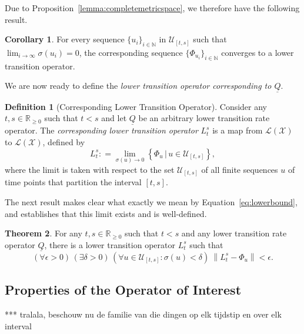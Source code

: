 \documentclass[10pt]{paper}
\theoremstyle{definition}
\newtheorem{theorem}{Theorem}
\newtheorem{corollary}[theorem]{Corollary}
\newtheorem{definition}{Definition}
\newcommand{\nats}{\mathbb{N}}
\newcommand{\reals}{\mathbb{R}}
\newcommand{\realsnonneg}{\reals_{\geq 0}}
\newcommand{\states}{\mathcal{X}}
\newcommand{\lbound}{L}
\newcommand{\gambles}{\mathcal{L}}
\newcommand{\gamblesX}{\gambles(\states)}
\newcommand{\lrate}{\underline{Q}}
\newcommand{\norm}[1]{\left\lVert #1 \right\rVert}
\newcommand{\coloneqq}{:\!=}
\begin{document}
\noindent Due to Proposition~\ref{lemma:completemetricspace}, we therefore have the following result.

\begin{corollary}\label{corol:limitexistsandiscoherent}
For every sequence $\{u_i\}_{i\in\nats}$ in $\mathcal{U}_{[t,s]}$ such that $\lim_{i\to\infty}\sigma(u_i)=0$, the corresponding sequence $\{\Phi_{u_i}\}_{i\in\nats}$ converges to a lower transition operator.
\end{corollary}

\noindent We are now ready to define the \emph{lower transition operator corresponding to $\lrate$}.

\begin{definition}[Corresponding Lower Transition Operator]\label{def:low_trans}
Consider any $t,s\in\realsnonneg$ such that $t<s$ and let $\lrate$ be an arbitrary lower transition rate operator. The \emph{corresponding lower transition operator} $\lbound_t^s$ is a map from $\gamblesX$ to $\gamblesX$, defined by
\begin{equation}\label{eq:lowerbound}
\lbound_t^s\coloneqq\lim_{\sigma(u)\to0}\left\{ \Phi_u\,\Big\vert\,u\in\mathcal{U}_{[t,s]}\right\},
\end{equation}
where the limit is taken with respect to the set $\mathcal{U}_{[t,s]}$ of all finite sequences $u$ of time points that partition the interval $[t,s]$.
\end{definition}

\noindent The next result makes clear what exactly we mean by Equation~\eqref{eq:lowerbound}, and establishes that this limit exists and is well-defined.

\begin{theorem}\label{theo:convergencelowerbound}
For any $t,s\in\realsnonneg$ such that $t<s$ and any lower transition rate operator $\lrate$, there is a lower transition operator $\lbound_t^s$ such that 
\begin{equation*}
(\forall\epsilon>0)\,
(\exists\delta>0)\,
(\forall u\in\mathcal{U}_{[t,s]}\colon\sigma(u)<\delta)~\norm{\lbound_t^s - \Phi_u}<\epsilon.
\end{equation*}
\end{theorem}

\subsection{Properties of the Operator of Interest}

*** tralala, beschouw nu de familie van die dingen op elk tijdstip en over elk interval
\end{document}
